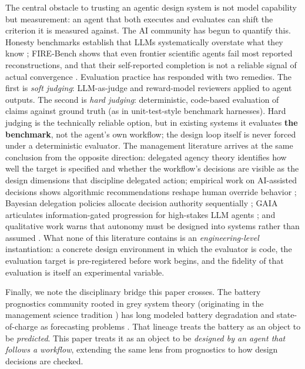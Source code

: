 The central obstacle to trusting an agentic design system is not model
capability but measurement: an agent that both executes and evaluates can
shift the criterion it is measured against. The AI community has begun to
quantify this. Honesty benchmarks establish that LLMs systematically
overstate what they know \cite{behonest2024, honesty2023alignment};
FIRE-Bench shows that even frontier scientific agents fail most reported
reconstructions, and that their self-reported completion is not a reliable
signal of actual convergence \cite{firebench2026}. Evaluation practice has
responded with two remedies. The first is \emph{soft judging}: LLM-as-judge
and reward-model reviewers applied to agent outputs. The second is
\emph{hard judging}: deterministic, code-based evaluation of claims against
ground truth (as in unit-test-style benchmark harnesses). Hard judging is
the technically reliable option, but in existing systems it evaluates
\textbf{the benchmark}, not the agent's own workflow; the design loop
itself is never forced under a deterministic evaluator. The management literature arrives at the same
conclusion from the opposite direction: delegated agency theory
\cite{delegatedagency2026} identifies how well the target is specified and
whether the workflow's decisions are visible as the design dimensions that discipline delegated
action; empirical work on AI-assisted decisions shows algorithmic
recommendations reshape human override behavior
\cite{nikpayam2024aiassisted}; Bayesian delegation policies allocate
decision authority sequentially \cite{dixon2026bayesiandelegation}; GAIA
articulates information-gated progression for high-stakes LLM agents
\cite{zhao2025gaia}; and qualitative work warns that autonomy must be
designed into systems rather than assumed
\cite{dancingalgorithm2025}. What none of this literature contains is an
\emph{engineering-level} instantiation: a concrete design environment in
which the evaluator is code, the evaluation target is pre-registered
before work begins, and the fidelity of that evaluation is itself an
experimental variable.

Finally, we note the disciplinary bridge this paper crosses. The battery
prognostics community rooted in grey system theory (originating in the
management science tradition \cite{deng1989grey}) has long modeled battery
degradation and state-of-charge as forecasting problems
\cite{li2025greyiterative, li2024hybridgrey, sapnken2025soh,
sapnken2024pemfc, sapnken2026greyneural, xu2025greykalman}. That lineage
treats the battery as an object to be \emph{predicted}. This paper treats it
as an object to be \emph{designed by an agent that follows a workflow},
extending the same lens from prognostics to how design decisions are checked.

